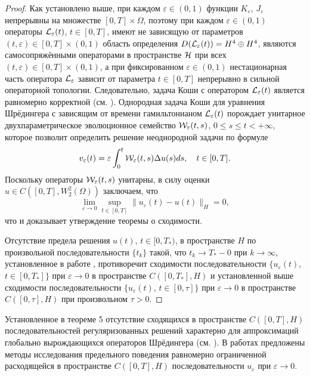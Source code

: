 \begin{proof}
Как установлено выше, при каждом $\varepsilon  \in (0, 1)$ функции $K_{\varepsilon }$, $ J_{\varepsilon  }$ непрерывны на множестве $[0, T]\times \Omega$, поэтому при каждом $\varepsilon \in (0, 1)$ операторы ${\cal L}_{\varepsilon }(t)$, $ t\in [0,T]$, имеют не зависящую от параметров $(t,\varepsilon )\in [0,T]\times (0, 1)$ область определения $D({\cal L}_{\varepsilon }(t))=H^4\oplus H^4$, являются самосопряжёнными операторами в пространстве  $\cal H$ при всех $(t,\varepsilon )\in [0,T]\times (0,1)$, а при фиксированном $\varepsilon \in (0,1)$ нестационарная часть оператора ${\cal L}_{\varepsilon }$ зависит от параметра $t\in [0, T]$ непрерывно в сильной операторной топологии.
Следовательно, задача Коши
с оператором ${\cal L}_{\varepsilon }(t)$ является равномерно корректной (см. \cite[п. 2.3]{SGK}). 
Однородная задача Коши для уравнения Шрёдингера с зависящим от времени гамильтонианом ${\cal L}_{\varepsilon }(t)$ порождает унитарное двухпараметрическое эволюционное семейство ${\cal W}_{\varepsilon }(t,s)$, $ 0\leq s\leq t <+\infty $, которое позволит определить решение неоднородной задачи по формуле
$$
v_{\varepsilon }(t)=\varepsilon \int_{0}^{t}{\cal W}_{\varepsilon }(t,s)\Delta u(s)ds,\quad 
t\in [0,T].
$$
Поскольку операторы ${\cal W}_{\varepsilon }(t,s)$ унитарны, в силу
оценки $u\in C([0,T],W^{2}_{2}(\Omega))$ заключаем, что
$$\lim\limits_{\varepsilon \to 0}\sup\limits_{t\in [0,T]}\|u_{\varepsilon 
}(t)-u(t)\|_{H}=0,$$ 
что и доказывает утверждение теоремы о сходимости.

Отсутствие предела решения $u(t)$, $t\in [0, T_*)$, в пространстве $H$ по произвольной последовательности $\{ t_k\}$ такой, что $t_k\to T_*-0$ при $k\to \infty $, установленное в работе \cite{Merle}, противоречит сходимости последовательности $\{ u_{\varepsilon }(t)$,  $t\in [0, T_*]\}$ при $\varepsilon \to 0$ в пространстве $C([0, T_*], H)$ и установленной выше сходимости последовательности $\{ u_{\varepsilon  }(t)$, $ t\in [0, \tau ]\}$ при $\varepsilon  \to 0$ в пространстве $C([0, \tau ], H)$ при произвольном $\tau >0$.  \end{proof}

\smallskip

\begin{remark}[3] Установленное в теореме 5 отсутствие сходящихся в пространстве $C([0,T],H)$  последовательностей регуляризованных решений характерно для аппроксимаций глобально вырождающихся операторов Шрёдингера (см. \cite{SR11}).  В работах \cite{STMF, puma} предложены методы исследования  предельного поведения равномерно ограниченной расходящейся в пространстве $C([0,T],H)$ последовательности $u_{\varepsilon }$ при $\varepsilon \to 0$.
\end{remark}


